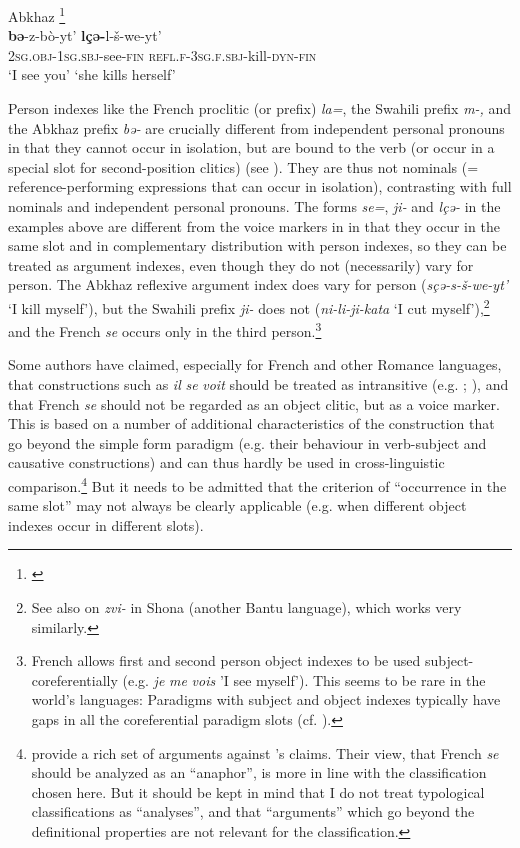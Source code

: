 \documentclass[output=paper]{langscibook}
\begin{document}
\ea Abkhaz \footnote{\citet[77,105]{Hewitt1979}}  
    \label{ex:Haspelmath:20}\\
    \gll \textbf{{bə}}{{}-z-bò-yt’} \textbf{{lçə-}}{l-š-we-yt’}\\
       \textsc{2sg.obj}{}-\textsc{1sg.sbj}{}-see-\textsc{fin}    \textsc{refl.f-3sg.f.sbj}{}-kill-\textsc{dyn-fin}  \\
    \glt ‘I see you’        ‘she kills herself’
\z
    

       

Person indexes like the French proclitic (or prefix) \textit{la=}, the Swahili prefix \textit{m-,} and the Abkhaz prefix \textit{bə-} are crucially different from independent personal pronouns in that they cannot occur in isolation, but are bound to the verb (or occur in a special slot for second-position clitics) (see \citealt{Haspelmath2013}). They are thus not nominals (= reference-performing expressions that can occur in isolation), contrasting with full nominals and independent personal pronouns. The forms \textit{se=}, \textit{ji-} and \textit{lçə-} in the examples above are different from the voice markers in  in that they occur in the same slot and in complementary distribution with person indexes, so they can be treated as argument indexes, even though they do not (necessarily) vary for person. The Abkhaz reflexive argument index does vary for person (\textit{sçə-s-š-we-yt’} ‘I kill myself’), but the Swahili prefix \textit{ji-} does not (\textit{ni-li-ji-kata} ‘I cut myself’),\footnote{ {See also \citet[\S. 4]{DechaineWiltschko2017a} on} {\textit{zvi-}} {in Shona (another Bantu language), which works very similarly.}} and the French \textit{se} occurs only in the third person.\footnote{ {French allows first and second person object indexes to be used subject-coreferentially (e.g.} {\textit{je} \textit{me} \textit{vois}} {’I see myself’). This seems to be rare in the world’s languages: Paradigms with subject and object indexes typically have gaps in all the coreferential paradigm slots (cf. \citealt{HampeLehmann2013}).}}

Some authors have claimed, especially for French and other Romance languages, that constructions such as \textit{il} \textit{se} \textit{voit} should be treated as intransitive (e.g. \citealt[\S2.1]{Reinhart2005}; \citealt[27--28]{Creissels2006}), and that French \textit{se} should not be regarded as an object clitic, but as a voice marker. This is based on a number of additional characteristics of the construction that go beyond the simple form paradigm (e.g. their behaviour in verb-subject and causative constructions) and can thus hardly be used in cross-linguistic comparison.\footnote{ {\citet{Doron2009} provide a rich set of arguments against \citeauthor{Reinhart2005}'s claims. Their view, that French} {\textit{se}} {should be analyzed as an “anaphor”, is more in line with the classification chosen here. But it should be kept in mind that I do not treat typological classifications as “analyses”, and that “arguments” which go beyond the definitional properties are not relevant for the classification.}} But it needs to be admitted that the criterion of “occurrence in the same slot” may not always be clearly applicable (e.g. when different object indexes occur in different slots).
\end{document}
